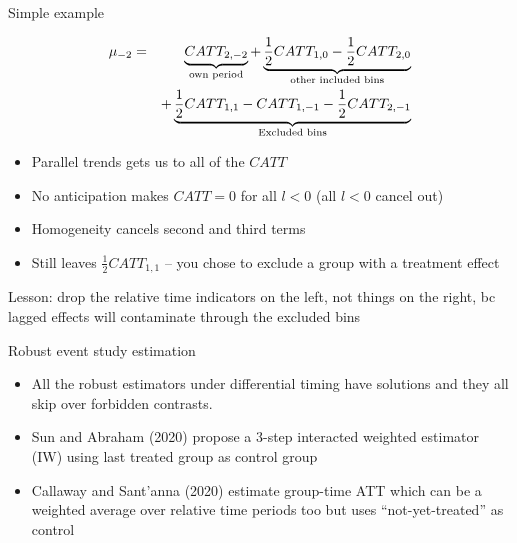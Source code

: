 \documentclass{beamer}
\begin{document}
\begin{frame}{Simple example}

\begin{eqnarray*}
\mu_{-2} &=& \underbrace{CATT_{2,-2}}_{\mathclap{\text{own period}}} + \underbrace{\frac{1}{2}CATT_{1,0} - \frac{1}{2} CATT_{2,0}}_{\mathclap{\text{other included bins}}} \\
&&+ \underbrace{ \frac{1}{2} CATT_{1,1} - CATT_{1,-1} - \frac{1}{2} CATT_{2,-1} }_{\mathclap{\text{Excluded bins}}}
\end{eqnarray*}

\begin{itemize}
\item Parallel trends gets us to all of the $CATT$
\item No anticipation makes $CATT=0$ for all $l<0$ (all $l<0$ cancel out)
\item Homogeneity cancels second and third terms
\item Still leaves $\frac{1}{2} CATT_{1,1}$ -- you chose  to exclude a group with a treatment effect
\end{itemize}Lesson: drop the relative time indicators on the left, not things on the right, bc lagged effects will contaminate through the excluded bins


\end{frame}


\begin{frame}{Robust event study estimation}


\begin{itemize}
\item All the robust estimators under differential timing have solutions and they all skip over forbidden contrasts. 
\item Sun and Abraham (2020) propose a 3-step interacted weighted estimator (IW) using last treated group as control group
\item Callaway and Sant'anna (2020) estimate group-time ATT which can be a weighted average over relative time periods too but uses ``not-yet-treated'' as control
\end{itemize}

\end{frame}
\end{document}
